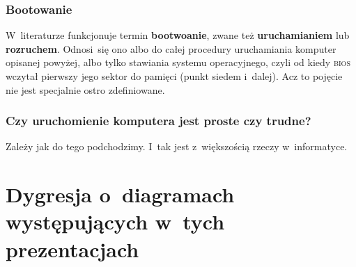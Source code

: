 \documentclass[10pt,t]{beamer}
\begin{document}
\begin{frame}
  \frametitle{Bootowanie}


  W~literaturze funkcjonuje termin \textbf{bootwoanie}, zwane też
  \textbf{uruchamianiem} lub \textbf{rozruchem}. Odnosi~się ono albo do
  całej procedury uruchamiania komputer opisanej powyżej, albo tylko
  stawiania systemu operacyjnego, czyli od kiedy \textsc{bios} wczytał
  pierwszy jego sektor do pamięci (punkt siedem i~dalej). Acz to pojęcie
  nie jest specjalnie ostro zdefiniowane.

\end{frame}





\begin{frame}
  \frametitle{Czy uruchomienie komputera jest proste czy trudne?}


  Zależy jak do tego podchodzimy. I~tak jest z~większością rzeczy
  w~informatyce.

\end{frame}








\section{Dygresja o~diagramach występujących w~tych
  prezentacjach}
\end{document}
